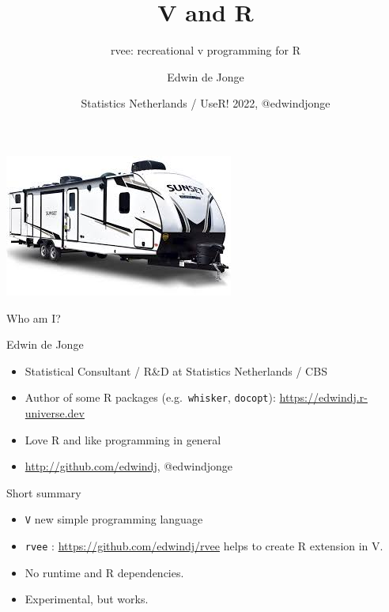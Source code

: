 \documentclass[
  ignorenonframetext,
]{beamer}
\title{V and R}
\subtitle{rvee: recreational v programming for R}
\author{Edwin de Jonge}
\date{Statistics Netherlands / UseR! 2022, @edwindjonge}
\providecommand{\tightlist}{%
  \setlength{\itemsep}{0pt}\setlength{\parskip}{0pt}}
\begin{document}
\frame{\titlepage}

\begin{frame}{}
\protect\hypertarget{section}{}
\begin{centering}
  \includegraphics[width=0.8\paperwidth]{img/rv}
  \par
\end{centering}
\end{frame}

\begin{frame}[fragile]{Who am I?}
\protect\hypertarget{who-am-i}{}
\begin{block}{Edwin de Jonge}
\protect\hypertarget{edwin-de-jonge}{}
\begin{itemize}
\tightlist
\item
  Statistical Consultant / R\&D at Statistics Netherlands / CBS
\item
  Author of some R packages (e.g.~\texttt{whisker}, \texttt{docopt}):
  \url{https://edwindj.r-universe.dev}
\item
  Love R and like programming in general
\item
  \url{http://github.com/edwindj}, @edwindjonge
\end{itemize}
\end{block}
\end{frame}

\begin{frame}[fragile]{Short summary}
\protect\hypertarget{short-summary}{}
\large

\begin{itemize}
\item
  \texttt{V} new simple programming language
\item
  \texttt{rvee} : \url{https://github.com/edwindj/rvee} helps to create
  R extension in V.
\item
  No runtime and R dependencies.
\item
  Experimental, but works.
\end{itemize}
\end{frame}
\end{document}
